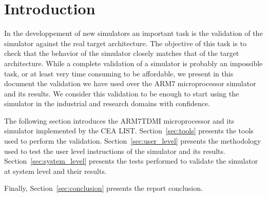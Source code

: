 \section{Introduction}
In the developpement of new simulators an important task is the validation of the simulator against the real target architecture.
The objective of this task is to check that the behavior of the simulator closely matches that of the target architecture.
While a complete validation of a simulator is probably an impossible task, or at least very time consuming to be affordable, we present in this document the validation we have used over the ARM7 microprocessor simulator and its results.
We consider this validation to be enough to start using the simulator in the industrial and research domains with confidence.

The following section introduces the ARM7TDMI microprocessor and its simulator implemented by the CEA LIST.
Section~\ref{sec:tools} presents the tools used to perform the validation.
Section~\ref{sec:user_level} presents the methodology used to test the user level instructions of the simulator and its results. Section~\ref{sec:system_level} presents the tests performed to validate the simulator at system level and their results.

Finally, Section~\ref{sec:conclusion} presents the report conclusion.
